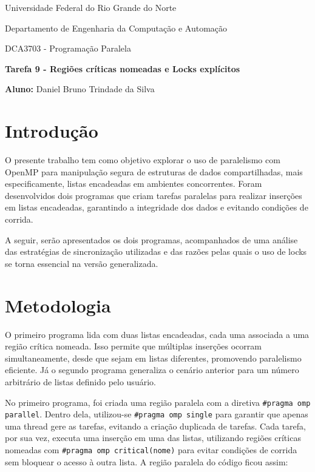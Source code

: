 \documentclass[a4paper, 12pt]{article}
\begin{document}
	\begin{center}
		Universidade Federal do Rio Grande do Norte
		
		Departamento de Engenharia da Computação e Automação
		
		DCA3703 - Programação Paralela
		
		\textbf{Tarefa 9 - Regiões críticas nomeadas e Locks explícitos}
		
		\textbf{Aluno:} Daniel Bruno Trindade da Silva
	\end{center}
	
	\section{Introdução}
	\hspace{0.7cm}O presente trabalho tem como objetivo explorar o uso de paralelismo com OpenMP para manipulação segura de estruturas de dados compartilhadas, mais especificamente, listas encadeadas em ambientes concorrentes. Foram desenvolvidos dois programas que criam tarefas paralelas para realizar inserções em listas encadeadas, garantindo a integridade dos dados e evitando condições de corrida.
	
	A seguir, serão apresentados os dois programas, acompanhados de uma análise das estratégias de sincronização utilizadas e das razões pelas quais o uso de locks se torna essencial na versão generalizada.

	\section{Metodologia}
	\hspace{0.7cm}O primeiro programa lida com duas listas encadeadas, cada uma associada a uma região crítica nomeada. Isso permite que múltiplas inserções ocorram simultaneamente, desde que sejam em listas diferentes, promovendo paralelismo eficiente. Já o segundo programa generaliza o cenário anterior para um número arbitrário de listas definido pelo usuário.

	No primeiro programa, foi criada uma região paralela com a diretiva \texttt{\#pragma omp parallel}. Dentro dela, utilizou-se \texttt{\#pragma omp single} para garantir que apenas uma thread gere as tarefas, evitando a criação duplicada de tarefas. Cada tarefa, por sua vez, executa uma inserção em uma das listas, utilizando regiões críticas nomeadas com \texttt{\#pragma omp critical(nome)} para evitar condições de corrida sem bloquear o acesso à outra lista. A região paralela do código ficou assim:
		
\end{document}
